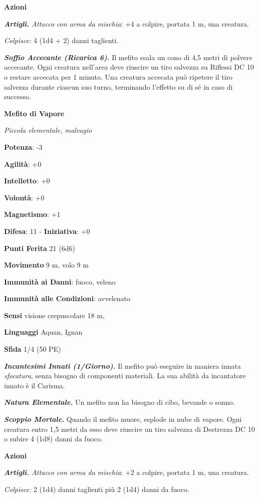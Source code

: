 \begin{multicols}{2}
\smallskip\textbf{Azioni}

\emph{\textbf{Artigli.} Attacco con arma da mischia}: +4 a colpire,
portata 1 m, una creatura.

\emph{Colpisce:} 4 (1d4 + 2) danni taglienti.

\emph{\textbf{Soffio Accecante (Ricarica 6).}} Il mefito esala un cono
di 4,5 metri di polvere accecante. Ogni creatura nell'area deve riuscire
un tiro salvezza su Riflessi DC 10 o restare accecata per 1 minuto. Una
creatura accecata può ripetere il tiro salvezza durante ciascun suo
turno, terminando l'effetto su di sé in caso di successo.

\textbf{Mefito di Vapore}

\emph{Piccola elementale, malvagio}

\textbf{Potenza}: -3

\textbf{Agilità}: +0

\textbf{Intelletto}: +0

\textbf{Volontà}: +0

\textbf{Magnetismo}: +1

\textbf{Difesa}: 11 - \textbf{Iniziativa}: +0

\textbf{Punti Ferita} 21 (6d6)

\textbf{Movimento} 9 m, volo 9 m

\textbf{Immunità ai Danni}: fuoco, veleno

\textbf{Immunità alle Condizioni}: avvelenato

\textbf{Sensi} visione crepuscolare 18 m, 

\textbf{Linguaggi} Aquan, Ignan

\textbf{Sfida} 1/4 (50 PE)\smallskip

\emph{\textbf{Incantesimi Innati (1/Giorno).}} Il mefito può eseguire in
maniera innata \emph{sfocatura}, senza bisogno di componenti materiali.
La sua abilità da incantatore innato è il Carisma.

\emph{\textbf{Natura Elementale.}} Un mefito non ha bisogno di cibo,
bevande o sonno.

\emph{\textbf{Scoppio Mortale.}} Quando il mefito muore, esplode in nube
di vapore. Ogni creatura entro 1,5 metri da esso deve riuscire un tiro
salvezza di Destrezza DC 10 o subire 4 (1d8) danni da fuoco.

\smallskip\textbf{Azioni}

\emph{\textbf{Artigli.} Attacco con arma da mischia}: +2 a colpire,
portata 1 m, una creatura.

\emph{Colpisce:} 2 (1d4) danni taglienti più 2 (1d4) danni da fuoco.


\end{multicols}
